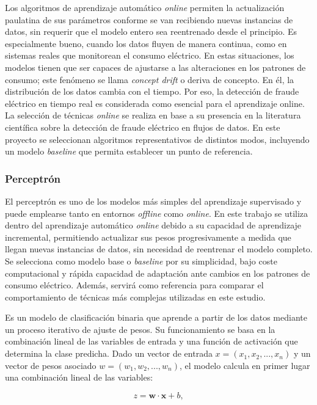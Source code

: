 \documentclass[12pt,a4paper]{report}
\begin{document}
Los algoritmos de aprendizaje automático \emph{online} permiten la actualización paulatina de sus parámetros conforme se van recibiendo nuevas instancias de datos, sin requerir que el modelo entero sea reentrenado desde el principio. Es especialmente bueno, cuando los datos fluyen de manera continua, como en sistemas reales que monitorean el consumo eléctrico. En estas situaciones, los modelos tienen que ser capaces de ajustarse a las alteraciones en los patrones de consumo; este fenómeno se llama \emph{concept drift} o deriva de concepto. En él, la distribución de los datos cambia con el tiempo. Por eso, la detección de fraude eléctrico en tiempo real es considerada como esencial para el aprendizaje online. La selección de técnicas \emph{online} se realiza en base a su presencia en la literatura científica sobre la detección de fraude eléctrico en flujos de datos. En este proyecto se seleccionan algoritmos representativos de distintos modos, incluyendo un modelo \emph{baseline} que permita establecer un punto de referencia.


\subsubsection{Perceptrón}

El perceptrón es uno de los modelos más simples del aprendizaje supervisado y puede emplearse tanto en entornos \emph{offline} como \emph{online}. En este trabajo se utiliza dentro del aprendizaje automático \emph{online} debido a su capacidad de aprendizaje incremental, permitiendo actualizar sus pesos progresivamente a medida que llegan nuevas instancias de datos, sin necesidad de reentrenar el modelo completo. Se selecciona como modelo base o \emph{baseline} por su simplicidad, bajo coste computacional y rápida capacidad de adaptación ante cambios en los patrones de consumo eléctrico. Además, servirá como referencia para comparar el comportamiento de técnicas más complejas utilizadas en este estudio.

Es un modelo de clasificación binaria que aprende a partir de los datos mediante un proceso iterativo de ajuste de pesos. Su funcionamiento se basa en la combinación lineal de las variables de entrada y una función de activación que determina la clase predicha. Dado un vector de entrada \( x = (x_1, x_2, ..., x_n) \) y un vector de pesos asociado \( w = (w_1, w_2, ..., w_n) \), el modelo calcula en primer lugar una combinación lineal de las variables:

\[z = \mathbf{w} \cdot \mathbf{x} + b ,\]
\end{document}
